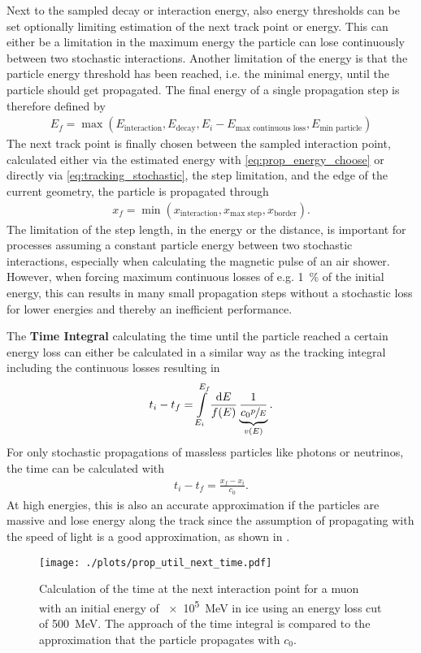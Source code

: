 Next to the sampled decay or interaction energy, also energy thresholds can be set optionally limiting estimation of the next track point or energy.
This can either be a limitation in the maximum energy the particle can lose continuously between two stochastic interactions.
Another limitation of the energy is that the particle energy threshold has been reached, i.e. the minimal energy, until the particle should get propagated.
The final energy of a single propagation step is therefore defined by
\begin{align} \label{eq:prop_energy_choose}
    E_f = \max(E_{\text{interaction}}, E_{\text{decay}}, E_i - E_{\text{max continuous loss}}, E_{\text{min particle}})
\end{align}
The next track point is finally chosen between the sampled interaction point, calculated either via the estimated energy with \eqref{eq:prop_energy_choose} or directly via \eqref{eq:tracking_stochastic}, the step limitation, and the edge of the current geometry, the particle is propagated through
\begin{align}
    x_f = \min(x_{\text{interaction}}, x_{\text{max step}}, x_{\text{border}}) .
\end{align}
The limitation of the step length, in the energy or the distance, is important for processes assuming a constant particle energy between two stochastic interactions, especially when calculating the magnetic pulse of an air shower.
However, when forcing maximum continuous losses of e.g. \SI{1}{\%} of the initial energy, this can results in many small propagation steps without a stochastic loss for lower energies and thereby an inefficient performance.

The \textbf{Time Integral} calculating the time until the particle reached a certain energy loss can either be calculated in a similar way as the tracking integral including the continuous losses resulting in
\begin{align} \label{eq:time_integral}
    t_i - t_f = \int\limits_{E_i}^{E_f} \frac{\mathrm{d} E}{f(E)} \underbrace{\frac{1}{c_0 \sfrac{p}{E}}}_{v(E)} .
\end{align}
For only stochastic propagations of massless particles like photons or neutrinos, the time can be calculated with
\begin{align}
    t_i - t_f = \frac{x_f - x_i}{c_0}.
\end{align}
At high energies, this is also an accurate approximation if the particles are massive and lose energy along the track since the assumption of propagating with the speed of light is a good approximation, as shown in .
\begin{figure}
    \centering
    \texttt{[image: ./plots/prop\_util\_next\_time.pdf]}
    \caption{Calculation of the time at the next interaction point for a muon with an initial energy of \SI{e5}{MeV} in ice using an energy loss cut of \SI{500}{MeV}. The approach of the time integral is compared to the approximation that the particle propagates with $c_0$.}
    \label{fig:prop_util_time}
\end{figure}

